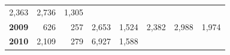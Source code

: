 \documentclass[]{article}
\begin{document}
\begin{longtable}[]{@{}rrrrrrrr@{}}
\begin{minipage}[t]{0.09\columnwidth}
2,363\strut
\end{minipage} & \begin{minipage}[t]{0.08\columnwidth}\raggedleft\strut
2,736\strut
\end{minipage} & \begin{minipage}[t]{0.10\columnwidth}\raggedleft\strut
1,305\strut
\end{minipage}\tabularnewline
\begin{minipage}[t]{0.08\columnwidth}\raggedleft\strut
\textbf{2009}\strut
\end{minipage} & \begin{minipage}[t]{0.10\columnwidth}\raggedleft\strut
626\strut
\end{minipage} & \begin{minipage}[t]{0.11\columnwidth}\raggedleft\strut
257\strut
\end{minipage} & \begin{minipage}[t]{0.08\columnwidth}\raggedleft\strut
2,653\strut
\end{minipage} & \begin{minipage}[t]{0.14\columnwidth}\raggedleft\strut
1,524\strut
\end{minipage} & \begin{minipage}[t]{0.09\columnwidth}\raggedleft\strut
2,382\strut
\end{minipage} & \begin{minipage}[t]{0.08\columnwidth}\raggedleft\strut
2,988\strut
\end{minipage} & \begin{minipage}[t]{0.10\columnwidth}\raggedleft\strut
1,974\strut
\end{minipage}\tabularnewline
\begin{minipage}[t]{0.08\columnwidth}\raggedleft\strut
\textbf{2010}\strut
\end{minipage} & \begin{minipage}[t]{0.10\columnwidth}\raggedleft\strut
2,109\strut
\end{minipage} & \begin{minipage}[t]{0.11\columnwidth}\raggedleft\strut
279\strut
\end{minipage} & \begin{minipage}[t]{0.08\columnwidth}\raggedleft\strut
6,927\strut
\end{minipage} & \begin{minipage}[t]{0.14\columnwidth}\raggedleft\strut
1,588\strut
\end{minipage} & \begin{minipage}[t]{0.09\columnwidth}\raggedleft\strut

\end{minipage}
\end{longtable}
\end{document}
